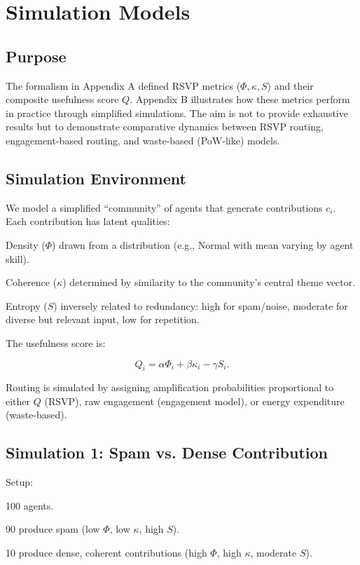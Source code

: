 \documentclass{book}
\begin{document}
\chapter{Simulation Models}

\section{Purpose}

The formalism in Appendix A defined RSVP metrics (\( \Phi, \kappa, S \)) and their composite usefulness score \( Q \). Appendix B illustrates how these metrics perform in practice through simplified simulations. The aim is not to provide exhaustive results but to demonstrate comparative dynamics between RSVP routing, engagement-based routing, and waste-based (PoW-like) models.

\section{Simulation Environment}

We model a simplified “community” of agents that generate contributions \( c_i \). Each contribution has latent qualities:

Density (\( \Phi \)) drawn from a distribution (e.g., Normal with mean varying by agent skill).

Coherence (\( \kappa \)) determined by similarity to the community’s central theme vector.

Entropy (\( S \)) inversely related to redundancy: high for spam/noise, moderate for diverse but relevant input, low for repetition.

The usefulness score is:

\[ Q_i = \alpha \Phi_i + \beta \kappa_i - \gamma S_i. \]

Routing is simulated by assigning amplification probabilities proportional to either \( Q \) (RSVP), raw engagement (engagement model), or energy expenditure (waste-based).

\section{Simulation 1: Spam vs. Dense Contribution}

Setup:

100 agents.

90 produce spam (low \( \Phi \), low \( \kappa \), high \( S \)).

10 produce dense, coherent contributions (high \( \Phi \), high \( \kappa \), moderate \( S \)).
\end{document}
